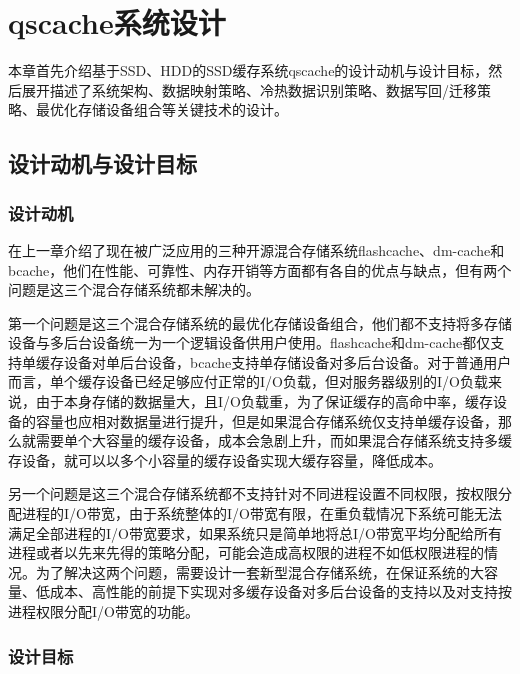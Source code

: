 
\chapter{qscache系统设计}
\label{chap:sys_design}

本章首先介绍基于SSD、HDD的SSD缓存系统qscache的设计动机与设计目标，然后展开描述了系统架构、数据映射策略、冷热数据识别策略、数据写回/迁移策略、最优化存储设备组合等关键技术的设计。

\section{设计动机与设计目标}

\subsection{设计动机}

在上一章介绍了现在被广泛应用的三种开源混合存储系统flashcache、dm-cache和bcache，他们在性能、可靠性、内存开销等方面都有各自的优点与缺点，但有两个问题是这三个混合存储系统都未解决的。

第一个问题是这三个混合存储系统的最优化存储设备组合，他们都不支持将多存储设备与多后台设备统一为一个逻辑设备供用户使用。flashcache和dm-cache都仅支持单缓存设备对单后台设备，bcache支持单存储设备对多后台设备。对于普通用户而言，单个缓存设备已经足够应付正常的I/O负载，但对服务器级别的I/O负载来说，由于本身存储的数据量大，且I/O负载重，为了保证缓存的高命中率，缓存设备的容量也应相对数据量进行提升，但是如果混合存储系统仅支持单缓存设备，那么就需要单个大容量的缓存设备，成本会急剧上升，而如果混合存储系统支持多缓存设备，就可以以多个小容量的缓存设备实现大缓存容量，降低成本。

另一个问题是这三个混合存储系统都不支持针对不同进程设置不同权限，按权限分配进程的I/O带宽，由于系统整体的I/O带宽有限，在重负载情况下系统可能无法满足全部进程的I/O带宽要求，如果系统只是简单地将总I/O带宽平均分配给所有进程或者以先来先得的策略分配，可能会造成高权限的进程不如低权限进程的情况。为了解决这两个问题，需要设计一套新型混合存储系统，在保证系统的大容量、低成本、高性能的前提下实现对多缓存设备对多后台设备的支持以及对支持按进程权限分配I/O带宽的功能。

\subsection{设计目标}

